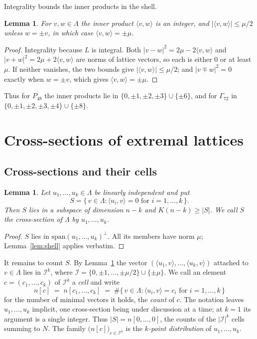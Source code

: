 \documentclass[11pt]{amsart}
\newtheorem{lemma}[theorem]{Lemma}
\theoremstyle{remark}
\newcommand{\Pff}{P_{48}}
\newcommand{\Gsz}{\Gamma_{72}}
\newcommand{\ip}[2]{\langle #1,#2\rangle}
\begin{document}
Integrality bounds the inner products in the shell.

\begin{lemma}\label{lem:ips}
For $v,w\in\Lambda$ the inner product $\ip{v}{w}$ is an integer, and
$|\ip{v}{w}|\le\mu/2$ unless $w=\pm v$, in which case $\ip{v}{w}=\pm\mu$.
\end{lemma}

\begin{proof}
Integrality because $L$ is integral. Both $|v-w|^2=2\mu-2\ip{v}{w}$ and
$|v+w|^2=2\mu+2\ip{v}{w}$ are norms of lattice vectors, so each is either $0$ or
at least $\mu$. If neither vanishes, the two bounds give $|\ip{v}{w}|\le\mu/2$;
and $|v\mp w|^2=0$ exactly when $w=\pm v$, which gives $\ip{v}{w}=\pm\mu$.
\end{proof}

Thus for $\Pff$ the inner products lie in $\{0,\pm1,\pm2,\pm3\}\cup\{\pm6\}$, and
for $\Gsz$ in $\{0,\pm1,\pm2,\pm3,\pm4\}\cup\{\pm8\}$.

\section{Cross-sections of extremal lattices}\label{sec:cross}

\subsection{Cross-sections and their cells}

\begin{lemma}\label{lem:cross}
Let $u_1,\dots,u_k\in\Lambda$ be linearly independent and put
\[
  S=\{\,v\in\Lambda : \ip{u_i}{v}=0 \text{ for } i=1,\dots,k\,\}.
\]
Then $S$ lies in a subspace of dimension $n-k$ and $K(n-k)\ge|S|$. We call $S$
the \emph{cross-section} of $\Lambda$ by $u_1,\dots,u_k$.
\end{lemma}

\begin{proof}
$S$ lies in $\mathrm{span}(u_1,\dots,u_k)^\perp$. All its members have norm
$\mu$; Lemma~\ref{lem:shell} applies verbatim.
\end{proof}

It remains to count $S$. By Lemma~\ref{lem:ips} the vector
$(\ip{u_1}{v},\dots,\ip{u_k}{v})$ attached to $v\in\Lambda$ lies in
$\mathcal I^k$, where $\mathcal I=\{0,\pm1,\dots,\pm\mu/2\}\cup\{\pm\mu\}$. We
call an element $c=(c_1,\dots,c_k)$ of $\mathcal I^k$ a \emph{cell} and write
\[
  n[c]\;=\;n[c_1,\dots,c_k]
  \;=\;\#\{\,v\in\Lambda : \ip{u_i}{v}=c_i \text{ for } i=1,\dots,k\,\}
\]
for the number of minimal vectors it holds, the \emph{count} of $c$. The notation
leaves $u_1,\dots,u_k$ implicit, one cross-section being under discussion at a
time; at $k=1$ its argument is a single integer. Thus $|S|=n[0,\dots,0]$, the
counts of the $|\mathcal I|^k$ cells summing to $N$. The family
$\bigl(n[c]\bigr)_{c\in\mathcal I^k}$ is the \emph{$k$-point
distribution} of $u_1,\dots,u_k$.
\end{document}
